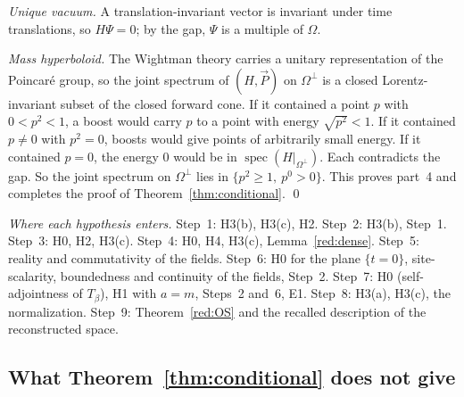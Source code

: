 \emph{Unique vacuum.} A translation-invariant vector is invariant under time translations, so $H\Psi=0$; by the gap, $\Psi$ is a multiple of $\Omega$.

\emph{Mass hyperboloid.} The Wightman theory carries a unitary representation of the Poincar\'e group, so the joint spectrum of $(H,\vec P)$ on $\Omega^\perp$ is a closed Lorentz-invariant subset of the closed forward cone. If it contained a point $p$ with $0<p^2<1$, a boost would carry $p$ to a point with energy $\sqrt{p^2}<1$. If it contained $p\ne0$ with $p^2=0$, boosts would give points of arbitrarily small energy. If it contained $p=0$, the energy $0$ would be in $\operatorname{spec}(H|_{\Omega^\perp})$. Each contradicts the gap. So the joint spectrum on $\Omega^\perp$ lies in $\{p^2\ge1,\ p^0>0\}$. This proves part~4 and completes the proof of Theorem~\ref{thm:conditional}. \qed

\emph{Where each hypothesis enters.} Step~1: H3(b), H3(c), H2. Step~2: H3(b), Step~1. Step~3: H0, H2, H3(c). Step~4: H0, H4, H3(c), Lemma~\ref{red:dense}. Step~5: reality and commutativity of the fields. Step~6: H0 for the plane $\{t=0\}$, site-scalarity, boundedness and continuity of the fields, Step~2. Step~7: H0 (self-adjointness of $T_\beta$), H1 with $a=m$, Steps~2 and~6, E1. Step~8: H3(a), H3(c), the normalization. Step~9: Theorem~\ref{red:OS} and the recalled description of the reconstructed space.

\subsection{What Theorem~\ref{thm:conditional} does not give}\label{red:not}

